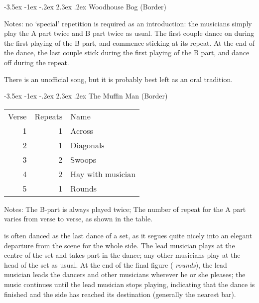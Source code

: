 \documentclass[12pt,a4paper]{article}
\makeatletter
\renewcommand\section{\@startsection {section}{1}{\z@}%
                                   {-3.5ex \@plus -1ex \@minus -.2ex}%
                                   {2.3ex \@plus.2ex}%
                                   {\normalfont\Large}}
\makeatother
\begin{document}

\pagebreak[4]

\section{Woodhouse Bog (Border)}


\noindent Notes: no `special' repetition is required as an
introduction: the musicians simply play the A part twice and B part
twice as usual. The first couple dance on during the first playing of
the B part, and commence sticking at its repeat. At the end of
the dance, the last couple stick during the first playing of the B
part, and dance off during the repeat.

There is an unofficial song, but it is probably best left
as an oral tradition.

\section{The Muffin Man (Border)}


\begin{minipage}[t]{7cm}
\vspace{0pt}
\begin{tabular}{rrl}
Verse & Repeats & Name \\
1 & 1 & Across \\
2 & 1 & Diagonals \\
3 & 2 & Swoops \\
4 & 2 & Hay with musician \\
5 & 1 & Rounds \\
\end{tabular}
\end{minipage} \hspace{3mm} \begin{minipage}[t]{9cm}
\vspace{0pt}
\noindent Notes: The B-part is always played twice; The number of
repeat for the A part varies from verse to verse, as shown in the
table.
\end{minipage}

\medskip

 is often danced as the last dance of a
set, as it segues quite nicely into an elegant departure from the
scene for the whole side.  The lead musician plays at the centre of
the set and takes part in the dance; any other musicians play at the
head of the set as usual. At the end of the final figure ({\it
  rounds}), the lead musician leads the dancers and other musicians
wherever he or she pleases; the music continues until the lead
musician stops playing, indicating that the dance is finished and the
side has reached its destination (generally the nearest bar).
\end{document}
